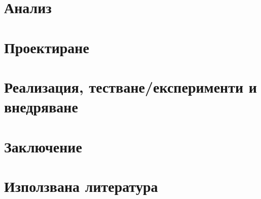 \documentclass[a4paper,12pt]{article}
\begin{document}
\section{Анализ}

\section{Проектиране}

\section{Реализация, тестване/експерименти и внедряване}

\section{Заключение}

\section{Използвана литература}
\end{document}
